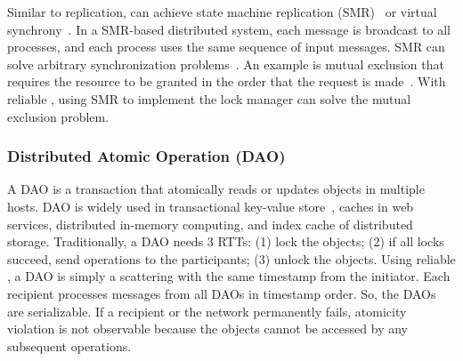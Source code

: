 

Similar to replication, \sys{} can achieve state machine replication (SMR)~\cite{lamport1978time} or virtual synchrony~\cite{birman1987exploiting}. In a SMR-based distributed system, each message is broadcast to all processes, and each process uses the same sequence of input messages.
SMR can solve arbitrary synchronization problems~\cite{lamport1978time}. An example is mutual exclusion that requires the resource to be granted in the order that the request is made~\cite{lamport1978time}.
With reliable \sys{}, using SMR to implement the lock manager can solve the mutual exclusion problem.


\subsubsection{Distributed Atomic Operation (DAO)}
\label{subsec:dao}

A DAO is a transaction that atomically reads or updates objects in multiple hosts. DAO is widely used in transactional key-value store~\cite{dey2014ycsbt}, caches in web services, distributed in-memory computing, and index cache of distributed storage.
Traditionally, a DAO needs 3 RTTs: (1) lock the objects; (2) if all locks succeed, send operations to the participants; (3) unlock the objects.
Using reliable \sys{}, a DAO is simply a scattering with the same timestamp from the initiator.
Each recipient processes messages from all DAOs in timestamp order. So, the DAOs are serializable.
If a recipient or the network permanently fails, atomicity violation is not observable because the objects cannot be accessed by any subsequent operations.


